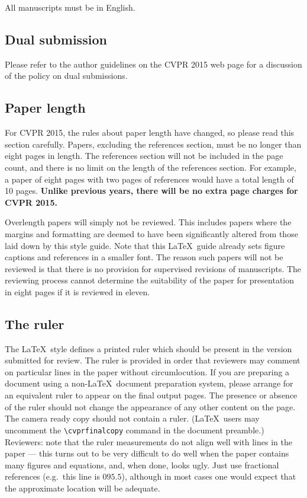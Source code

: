 \documentclass[10pt,twocolumn,letterpaper]{article}
\begin{document}
All manuscripts must be in English.

\subsection{Dual submission}

Please refer to the author guidelines on the CVPR 2015 web page for a
discussion of the policy on dual submissions.

\subsection{Paper length}
For CVPR 2015, the rules about paper length have changed, so please
read this section carefully. Papers, excluding the references section,
must be no longer than eight pages in length. The references section
will not be included in the page count, and there is no limit on the
length of the references section. For example, a paper of eight pages
with two pages of references would have a total length of 10 pages.
{\bf Unlike previous years, there will be no extra page charges for
  CVPR 2015.}

Overlength papers will simply not be reviewed.  This includes papers
where the margins and formatting are deemed to have been significantly
altered from those laid down by this style guide.  Note that this
\LaTeX\ guide already sets figure captions and references in a smaller font.
The reason such papers will not be reviewed is that there is no provision for
supervised revisions of manuscripts.  The reviewing process cannot determine
the suitability of the paper for presentation in eight pages if it is
reviewed in eleven.  

\subsection{The ruler}
The \LaTeX\ style defines a printed ruler which should be present in the
version submitted for review.  The ruler is provided in order that
reviewers may comment on particular lines in the paper without
circumlocution.  If you are preparing a document using a non-\LaTeX\
document preparation system, please arrange for an equivalent ruler to
appear on the final output pages.  The presence or absence of the ruler
should not change the appearance of any other content on the page.  The
camera ready copy should not contain a ruler. (\LaTeX\ users may uncomment
the \verb'\cvprfinalcopy' command in the document preamble.)  Reviewers:
note that the ruler measurements do not align well with lines in the paper
--- this turns out to be very difficult to do well when the paper contains
many figures and equations, and, when done, looks ugly.  Just use fractional
references (e.g.\ this line is $095.5$), although in most cases one would
expect that the approximate location will be adequate.
\end{document}
